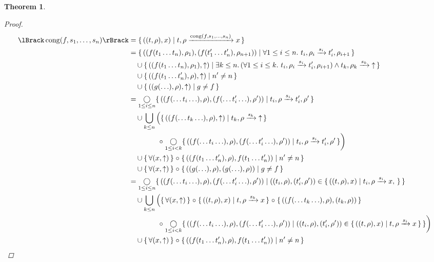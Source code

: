 \documentclass{article}
\newtheorem{theorem}{Theorem}
\newcommand{\fail}{\ensuremath \text{$\uparrow$}}
\newcommand{\congr}[1]{\ensuremath \operatorname{cong}(#1)}
\newcommand{\transform}[5]{#1, #2 \xrightarrow{#3} #4, #5}
\newcommand{\transformx}[4]{#1, #2 \xrightarrow{#3} #4}
\newcommand{\transformfail}[3]{#1, #2 \xrightarrow{#3} \fail}
\newcommand{\sem}[1]{\ensuremath \lBrack #1 \rBrack}
\newcommand{\setbuild}[2]{\ensuremath \{\, #1 \mid #2 \,\}}
\newcommand{\setbuildc}[1]{\ensuremath \{\, #1 \,\}}
\newcommand{\comp}{\ensuremath \mathrel{\circ}}
\newcommand{\Comp}{\ensuremath \mathop{\bigcirc}}
\begin{document}
\begin{theorem}
\begin{proof}
\begin{align*}
  \sem{\congr{f,s_1,\ldots,s_n}}
    &= \setbuild{((t,\rho),x)}{\transformx{t}{\rho}{\congr{f,s_1,\ldots,s_n}}{x}} \\
    &= \setbuild{((f(t_1\ldots t_n),\rho_1),(f(t_1'\ldots t_n'),\rho_{n+1}))}{ \forall 1 \leq i \leq n.\ \transform{t_i}{\rho_i}{s_i}{t_i'}{\rho_{i+1}}} \\
    &\quad \cup \setbuild{((f(t_1\ldots t_n),\rho_1),\fail)}{ \exists k \leq n.\, (\forall 1 \leq i \leq k.\ \transform{t_i}{\rho_i}{s_i}{t_i'}{\rho_{i+1}}) \land \transformfail{t_k}{\rho_k}{s_k}} \\
    &\quad \cup \setbuild{((f(t_1\ldots t_n'),\rho),\fail)}{ n' \neq n } \\
    &\quad \cup \setbuild{((g(\ldots),\rho),\fail)}{ g \neq f } \\
    &= \Comp_{1\leq i \leq n} \setbuild{((f(\ldots t_i \ldots),\rho),(f(\ldots t_i' \ldots),\rho'))}{ \transform{t_i}{\rho}{s_i}{t_i'}{\rho'} } \\
    &\quad \cup \bigcup_{k \leq n} \left( \setbuild{ ((f(\ldots t_k \ldots),\rho),\fail) }{ \transformx{t_k}{\rho}{s_k}{\fail} } \right. \\
    &\qquad\qquad \left. \comp \mathop{\bigcirc}_{1\leq i < k} \setbuild{((f(\ldots t_i \ldots),\rho),(f(\ldots t_i' \ldots),\rho'))}{ \transform{t_i}{\rho}{s_i}{t_i'}{\rho'} } \right) \\
    &\quad \cup \setbuildc{ \forall (x,\fail) } \comp \setbuild{((f(t_1\ldots t_n'),\rho),f(t_1\ldots t_n'))}{ n' \neq n } \\
    &\quad \cup \setbuildc{ \forall (x,\fail) } \comp \setbuild{((g(\ldots),\rho),(g(\ldots),\rho))}{ g \neq f } \\
    &= \Comp_{1\leq i \leq n} \setbuild{((f(\ldots t_i \ldots),\rho),(f(\ldots t_i' \ldots),\rho'))}{ ((t_i,\rho),(t_i',\rho')) \in \setbuild{ ((t,\rho),x) }{ \transform{t_i}{\rho}{s_i}{x} } } \\
    &\quad \cup \bigcup_{k \leq n} \left( \setbuildc{ \forall (x,\fail) } \comp \setbuild{ ((t,\rho),x) }{ \transformx{t}{\rho}{s_k}{x} } \comp \setbuildc{ ((f(\ldots t_k \ldots),\rho),(t_k,\rho)) } \right. \\
    &\qquad\qquad \left. \comp \mathop{\bigcirc}_{1\leq i < k} \setbuild{((f(\ldots t_i \ldots),\rho),(f(\ldots t_i' \ldots),\rho'))}{ ((t_i,\rho),(t_i',\rho')) \in \setbuild{ ((t,\rho),x) }{ \transformx{t}{\rho}{s_i}{x} } } \right) \\
    &\quad \cup \setbuildc{ \forall (x,\fail) } \comp \setbuild{((f(t_1\ldots t_n'),\rho),f(t_1\ldots t_n'))}{ n' \neq n } \\

\end{align*}
\end{proof}
\end{theorem}
\end{document}
